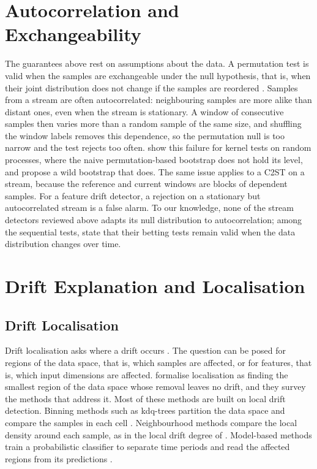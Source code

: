 \section{Autocorrelation and Exchangeability}
\label{sec:lit-autocorr}
The guarantees above rest on assumptions about the data. A permutation test is valid when the samples are exchangeable under the null hypothesis, that is, when their joint distribution does not change if the samples are reordered \citep{Good2005}. Samples from a stream are often autocorrelated: neighbouring samples are more alike than distant ones, even when the stream is stationary. A window of consecutive samples then varies more than a random sample of the same size, and shuffling the window labels removes this dependence, so the permutation null is too narrow and the test rejects too often. \citet{Chwialkowski2014} show this failure for kernel tests on random processes, where the naive permutation-based bootstrap does not hold its level, and propose a wild bootstrap that does. The same issue applies to a C2ST on a stream, because the reference and current windows are blocks of dependent samples. For a feature drift detector, a rejection on a stationary but autocorrelated stream is a false alarm. To our knowledge, none of the stream detectors reviewed above adapts its null distribution to autocorrelation; among the sequential tests, \citet{PodkopaevRamdas2023} state that their betting tests remain valid when the data distribution changes over time.

\section{Drift Explanation and Localisation}
\label{sec:lit-explanation}

\subsection{Drift Localisation}
Drift localisation asks where a drift occurs \citep{HinderLocalization2024}. The question can be posed for regions of the data space, that is, which samples are affected, or for features, that is, which input dimensions are affected. \citet{HinderLocalization2024} formalise localisation as finding the smallest region of the data space whose removal leaves no drift, and they survey the methods that address it. Most of these methods are built on local drift detection. Binning methods such as kdq-trees partition the data space and compare the samples in each cell \citep{Dasu2006}. Neighbourhood methods compare the local density around each sample, as in the local drift degree of \citet{Liu2017LDD}. Model-based methods train a probabilistic classifier to separate time periods and read the affected regions from its predictions \citep{HinderLocalization2024}.

